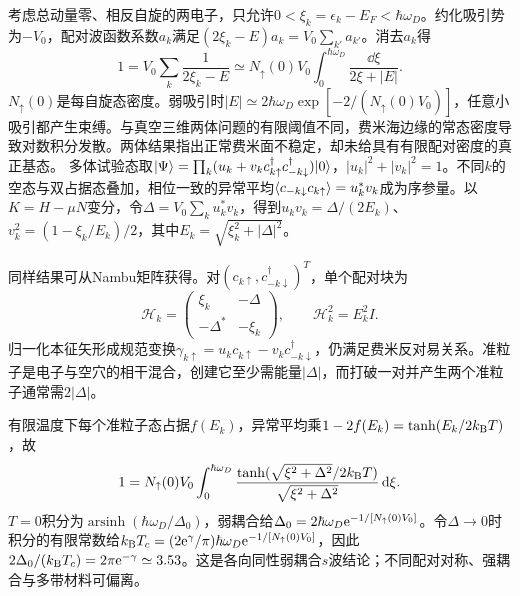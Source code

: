 \label{ch:bcs}
考虑总动量零、相反自旋的两电子，只允许$0<\xi_k=\epsilon_k-E_F<\hbar\omega_D$。约化吸引势为$-V_0$，配对波函数系数$a_k$满足$(2\xi_k-E)a_k=V_0\sum_{k'}a_{k'}$。消去$a_k$得
\begin{equation}
1=V_0\sum_k\frac1{2\xi_k-E}\simeq N_\uparrow(0)V_0\int_0^{\hbar\omega_D}\frac{\dd\xi}{2\xi+|E|}.
\end{equation}
$N_\uparrow(0)$是每自旋态密度。弱吸引时$|E|\simeq2\hbar\omega_D\exp[-2/(N_\uparrow(0)V_0)]$，任意小吸引都产生束缚。与真空三维两体问题的有限阈值不同，费米海边缘的常态密度导致对数积分发散。两体结果指出正常费米面不稳定，却未给具有有限配对密度的真正基态。
多体试验态取$\lvert \Psi\rangle=\prod_k(u_k+v_kc_{k\uparrow}^\dagger c_{-k\downarrow}^\dagger)\lvert 0\rangle$，$|u_k|^2+|v_k|^2=1$。不同$k$的空态与双占据态叠加，相位一致的异常平均$\langle c_{-k\downarrow}c_{k\uparrow}\rangle=u_k^*v_k$成为序参量。以$K=H-\mu N$变分，令$\Delta=V_0\sum_ku_k^*v_k$，得到$u_kv_k=\Delta/(2E_k)$、$v_k^2=(1-\xi_k/E_k)/2$，其中$E_k=\sqrt{\xi_k^2+|\Delta|^2}$。

同样结果可从Nambu矩阵获得。对$(c_{k\uparrow},c_{-k\downarrow}^\dagger)^T$，单个配对块为
\begin{equation}
\mathcal H_k=\begin{pmatrix}\xi_k&-\Delta\\-\Delta^*&-\xi_k\end{pmatrix},\qquad \mathcal H_k^2=E_k^2I.
\end{equation}
归一化本征矢形成规范变换$\gamma_{k\uparrow}=u_kc_{k\uparrow}-v_kc_{-k\downarrow}^\dagger$，仍满足费米反对易关系。准粒子是电子与空穴的相干混合，创建它至少需能量$|\Delta|$，而打破一对并产生两个准粒子通常需$2|\Delta|$。

有限温度下每个准粒子态占据$f(E_k)$，异常平均乘$1-2f(E_k)=\tanh(E_k/2k_{\mathrm B} T)$，故
\begin{equation}
1=N_\uparrow(0)V_0\int_0^{\hbar\omega_D}\frac{\tanh(\sqrt{\xi^2+\Delta^2}/2k_{\mathrm B} T)}{\sqrt{\xi^2+\Delta^2}}\,\mathrm d\xi.
\end{equation}
$T=0$积分为$\operatorname{arsinh}(\hbar\omega_D/\Delta_0)$，弱耦合给$\Delta_0=2\hbar\omega_D\mathrm e^{-1/[N_\uparrow(0)V_0]}$。令$\Delta\to0$时积分的有限常数给$k_{\mathrm B} T_c=(2\mathrm e^\gamma/\pi)\hbar\omega_D\mathrm e^{-1/[N_\uparrow(0)V_0]}$，因此$2\Delta_0/(k_{\mathrm B} T_c)=2\pi\mathrm e^{-\gamma}\simeq3.53$。这是各向同性弱耦合$s$波结论；不同配对对称、强耦合与多带材料可偏离。

